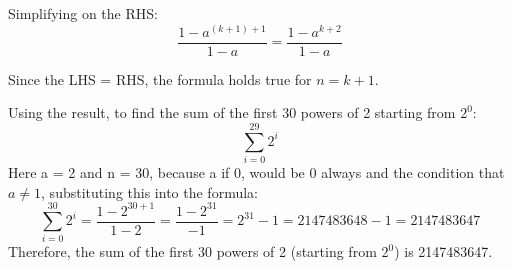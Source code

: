 \documentclass[11pt]{article}
\begin{document}
\begin{enumerate}
\begin{enumerate}
    Simplifying on the RHS:
    \begin{equation*}
        \frac{1-a^{(k+1)+1}}{1-a} = \frac{1-a^{k+2}}{1-a}
    \end{equation*}

    Since the LHS = RHS, the formula holds true for $n = k+1$.

    Using the result, to find the sum of the first 30 powers of 2 starting from $2^0$:
    \begin{equation*}
        \sum_{i=0}^{29} 2^i
    \end{equation*}
    Here a = 2 and n = 30, because a if 0, would be 0 always and the condition that $a \neq 1$, substituting this into the formula:
    \begin{equation*}
        \sum_{i=0}^{30} 2^i = \frac{1-2^{30+1}}{1-2} = \frac{1-2^{31}}{-1} = 2^{31}-1 = 2147483648 - 1 = 2147483647
    \end{equation*}
    Therefore, the sum of the first 30 powers of 2 (starting from $2^0$) is 2147483647.
\end{enumerate}

\end{enumerate}
\end{document}
